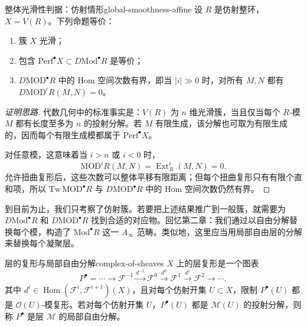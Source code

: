 \begin{theorem}{整体光滑性判据：仿射情形}{global-smoothness-affine}
设 $R$ 是仿射整环，$X=V(R)$。下列命题等价：
\begin{enumerate}[label=(\roman*)]
  \item 簇 $X$ 光滑；
  \item 包含 $\mathrm{Perf}^{\bullet}X\subset D\mathrm{Mod}^{\bullet}R$ 是等价；
  \item $D\mathrm{MOD}^{\bullet}R$ 中的 Hom 空间次数有界，即当 $|i|\gg0$ 时，对所有 $M,N$ 都有 $D\mathrm{MOD}^{i}R(M,N)=0$。
\end{enumerate}
\end{theorem}
\begin{proof}[证明思路]
代数几何中的标准事实是：$V(R)$ 为 $n$ 维光滑簇，当且仅当每个 $R$-模 $M$ 都有长度至多为 $n$ 的投射分解。若 $M$ 有限生成，该分解也可取为有限生成的，因而每个有限生成模都属于 $\mathrm{Perf}^{\bullet}X$。

对任意模，这意味着当 $i>n$ 或 $i<0$ 时，
\[
  \mathrm{MOD}^{i}R(M,N)=\operatorname{Ext}^{i}_R(M,N)=0.
\]
允许扭曲复形后，这些次数可以整体平移有限距离；但每个扭曲复形只有有限个直和项，所以 $\mathrm{Tw}\,\mathrm{MOD}^{\bullet}R$ 与 $D\mathrm{MOD}^{\bullet}R$ 中的 Hom 空间次数仍然有界。
\end{proof}

到目前为止，我们只考察了仿射簇。若要把上述结果推广到一般簇，就需要为 $D\mathrm{Mod}^{\bullet}R$ 和 $D\mathrm{MOD}^{\bullet}R$ 找到合适的对应物。回忆第二章：我们通过以自由分解替换每个模，构造了 $\mathrm{Mod}^{\bullet}R$ 这一 $A_\infty$ 范畴。类似地，这里应当用局部自由层的分解来替换每个凝聚层。

\begin{definition}{层的复形与局部自由分解}{complex-of-sheaves}
$X$ 上的层复形是一个图表
\[
  P^{\bullet}=\cdots\longrightarrow\mathcal F^{-1}
  \xrightarrow{d^{-1}}\mathcal F^0
  \xrightarrow{d^0}\mathcal F^1
  \xrightarrow{d^1}\mathcal F^2\longrightarrow\cdots,
\]
其中 $d^i\in\operatorname{Hom}(\mathcal F^i,\mathcal F^{i+1})(X)$，且对每个仿射开集 $U\subset X$，限制 $P^{\bullet}(U)$ 都是 $\mathcal O(U)$-模复形。若对每个仿射开集 $U$，$P^{\bullet}(U)$ 都是 $\mathcal M(U)$ 的投射分解，则称 $P^{\bullet}$ 是层 $\mathcal M$ 的局部自由分解。
\end{definition}


